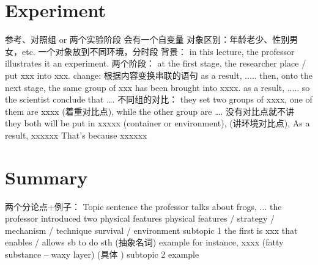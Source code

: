 \documentclass{ctexart}
\begin{document}
\section{Experiment}
\begin{outline}
    \1 参考、对照组 or 两个实验阶段
        \2 会有一个自变量
        \2 对象区别：年龄老少、性别男女，etc.
        \2 一个对象放到不同环境，分时段
    \1 背景：
        \2 in this lecture, the professor illustrates it an experiment.
    \1 两个阶段：
        \2 at the first stage, the researcher place / put xxx into xxx.
        \2 change: 根据内容变换串联的语句
        \2 as a result, .....
        \2 then, onto the next stage, the same group of xxx has been brought into xxxx.
        \2 as a result, .....
        \2 so the scientist conclude that \dots.
    \1 不同组的对比：
        \2 they set two groups of xxxx, one of them are xxxx (着重对比点), while the other group are \dots. 没有对比点就不讲
        \2 they both will be put in xxxxx (container or environment), (讲环境对比点),
        \2 As a result, xxxxxx
        \2 That's because xxxxxx

\end{outline}
\section{Summary}
\begin{outline}
    \1 两个分论点+例子：
        \2 Topic sentence
            \3 the professor talks about frogs, ...
            \3 the professor introduced two physical features 
            \3 physical features / strategy / mechanism / technique
            \3 survival / environment
        \2 subtopic 1
            \3 the first is xxx that enables / allows sb to do sth  (抽象名词)
        \2 example
            \3 for instance, xxxx (fatty substance -- waxy layer) (具体 )
        \2 subtopic 2
        \2 example
\end{outline}
\end{document}
